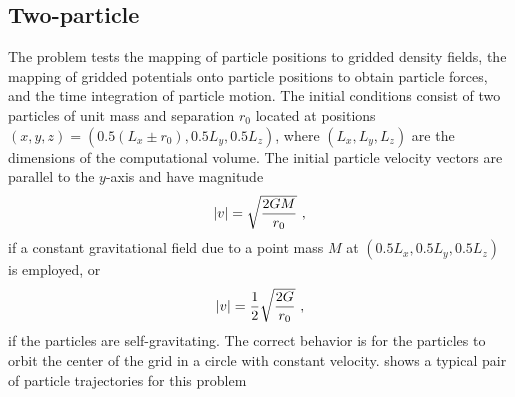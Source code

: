 \subsection{Two-particle }
\label{Sec:SimulationOrbit}
The  problem tests the mapping of particle positions
to gridded density fields, the mapping of gridded potentials onto
particle positions to obtain particle forces, and the time
integration of particle motion. The initial conditions consist of
two particles of unit mass and separation $r_0$ located at positions
$(x,y,z) = (0.5(L_x\pm r_0),0.5L_y,0.5L_z)$, where $(L_x,L_y,L_z)$
are the dimensions of the computational volume. The initial particle
velocity vectors are parallel to the $y$-axis and have magnitude
\begin{equation}
|v| = \sqrt{2GM\over r_0}~,
\end{equation}
if a constant gravitational field due to a point mass $M$ at
$(0.5L_x,0.5L_y,0.5L_z)$ is employed, or
\begin{equation}
|v| = {1\over2}\sqrt{2G\over r_0}~,
\end{equation}
if the particles are self-gravitating. The correct behavior is for the
particles to orbit the center of the grid in a circle with constant
velocity.   shows a typical pair of particle trajectories for
this problem




